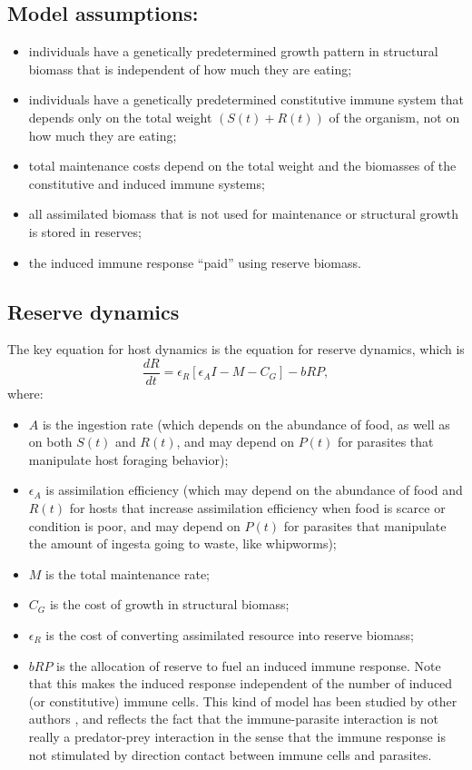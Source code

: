 \documentclass[11pt,reqno,final,pdftex]{amsart}\usepackage[]{graphicx}\usepackage[]{color}
\theoremstyle{plain}
\numberwithin{equation}{part}
\begin{document}
\subsection*{Model assumptions:}
\begin{itemize}
\item individuals have a genetically predetermined growth pattern in structural biomass that is independent of how much they are eating;
\item individuals have a genetically predetermined constitutive immune system that depends only on the total weight $(S(t)+R(t))$ of the organism, not on how much they are eating;
\item total maintenance costs depend on the total weight and the biomasses of the constitutive and induced immune systems;
\item all assimilated biomass that is not used for maintenance or structural growth is stored in reserves;
\item the induced immune response ``paid'' using reserve biomass.
\end{itemize}

\subsection*{Reserve dynamics}
The key equation for host dynamics is the equation for reserve dynamics, which is
\begin{equation}
\frac{dR}{dt}=\epsilon _R\left[\epsilon _A I-M-C_G\right]-b R P,
\end{equation}
where:
\begin{itemize}
\item $A$ is the ingestion rate (which depends on the abundance of food, as well as on both $S(t)$ and $R(t)$, and may depend on $P(t)$ for parasites that manipulate host foraging behavior);
\item $\epsilon _A$ is assimilation efficiency (which may depend on the abundance of food and $R(t)$ for hosts that increase assimilation efficiency when food is scarce or condition is poor, and may depend on $P(t)$ for parasites that manipulate the amount of ingesta going to waste, like whipworms);
\item $M$ is the total maintenance rate;
\item $C_G$ is the cost of growth in structural biomass;
\item $\epsilon _R$ is the cost of converting assimilated resource into reserve biomass;
\item $bRP$ is the allocation of reserve to fuel an induced immune response. Note that this makes the induced response independent of the number of induced (or constitutive) immune cells. This kind of model has been studied by other authors \citep{Bonhoeffer1994,Alizon2005,Fenton2006,Hamilton2008}, and reflects the fact that the immune-parasite interaction is not really a predator-prey interaction in the sense that the immune response is not stimulated by direction contact between immune cells and parasites.
\end{itemize}
\end{document}
